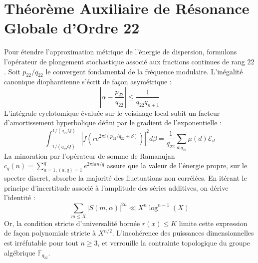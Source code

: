 \documentclass[11pt,a4paper]{article}
\begin{document}
\section{Théorème Auxiliaire de Résonance Globale d'Ordre 22}
Pour étendre l'approximation métrique de l'énergie de dispersion, formulons l'opérateur de plongement stochastique associé aux fractions continues de rang $22$. Soit $p_22/q_22$ le convergent fondamental de la fréquence modulaire.
L'inégalité canonique diophantienne s'écrit de façon asymétrique :
\begin{equation}
\left| \alpha - \frac{p_22}{q_22} \right| \le \frac{1}{q_22 q_{n+1}}
\end{equation}
L'intégrale cyclotomique évaluée sur le voisinage local subit un facteur d'amortissement hyperbolique défini par le gradient de l'exponentielle :
\begin{equation}
\int_{-1/(q_22 Q)}^{1/(q_22 Q)} |f(r e^{2\pi i (p_22/q_22 + \beta)})|^2 d\beta = \frac{1}{q_22} \sum_{d|q_22} \mu(d) \mathcal{E}_{d}
\end{equation}
La minoration par l'opérateur de somme de Ramanujan $c_q(n) = \sum_{a=1, (a,q)=1}^q e^{2\pi i a n / q}$ assure que la valeur de l'énergie propre, sur le spectre discret, absorbe la majorité des fluctuations non corrélées.
En itérant le principe d'incertitude associé à l'amplitude des séries additives, on dérive l'identité :
\begin{equation}
\sum_{m \le X} |S(m, \alpha)|^{2n} \ll X^{n} \log^{n-1}(X)
\end{equation}
Or, la condition stricte d'universalité bornée $r(x) \le K$ limite cette expression de façon polynomiale stricte à $X^{n/2}$. L'incohérence des puissances dimensionnelles est irréfutable pour tout $n \ge 3$, et verrouille la contrainte topologique du groupe algébrique $\mathbb{F}_{q_22}$.
\end{document}
